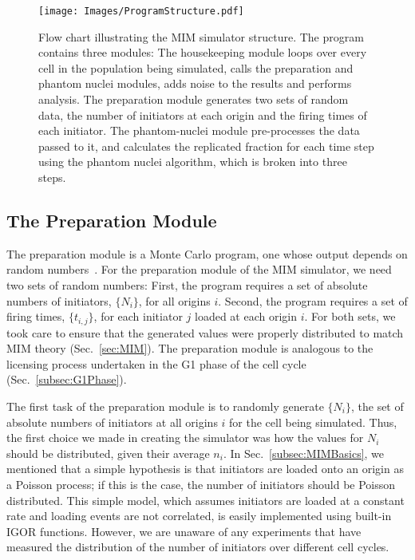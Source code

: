 	\begin{figure}[tbh!]
		\begin{center}
			\texttt{[image: Images/ProgramStructure.pdf]}
		\end{center}
			\caption[MIM Simulator Program Structure]{\label{fig:ProgramStructure} 
				Flow chart illustrating the MIM simulator structure.
				The program contains three modules: 
				The housekeeping module loops over every cell in the population being simulated, calls the preparation and phantom nuclei modules, adds noise to the results and performs analysis.
				The preparation module generates two sets of random data, the number of initiators at each origin and the firing times of each initiator.
				The phantom-nuclei module pre-processes the data passed to it, and calculates the replicated fraction for each time step using the phantom nuclei algorithm, which is broken into three steps.
			}
	\end{figure}
	
	
		\subsection{The Preparation Module}
		\label{subsec:PrepModule}
		
		The preparation module is a Monte Carlo program, one whose output depends on random numbers~\cite{CompPhys}.
		For the preparation module of the MIM simulator,  we need two sets of random numbers:
		First, the program requires a set of absolute numbers of initiators, $\{N_i\}$, for all origins $i$.
		Second, the program requires a set of firing times, $\{t_{i,j}\}$, for each initiator $j$ loaded at each origin $i$.
		For both sets, we took care to ensure that the generated values were properly distributed to match MIM theory (Sec.~\ref{sec:MIM}).
		The preparation module is analogous to the licensing process undertaken in the G1 phase of the cell cycle (Sec.~\ref{subsec:G1Phase}).
			
		The first task of the preparation module is to randomly generate $\{N_i\}$, the set of absolute numbers of initiators at all origins $i$ for the cell being simulated.
		Thus, the first choice we made in creating the simulator was how the values for $N_i$ should be distributed, given their average $n_i$.
		In Sec.~\ref{subsec:MIMBasics}, we mentioned that a simple hypothesis is that initiators are loaded onto an origin as a Poisson process; if this is the case, the number of initiators should be Poisson distributed.
		This simple model, which assumes initiators are loaded at a constant rate and loading events are not correlated, is easily implemented using built-in IGOR functions.
		However, we are unaware of any experiments that have measured the distribution of the number of initiators over different cell cycles.
		
